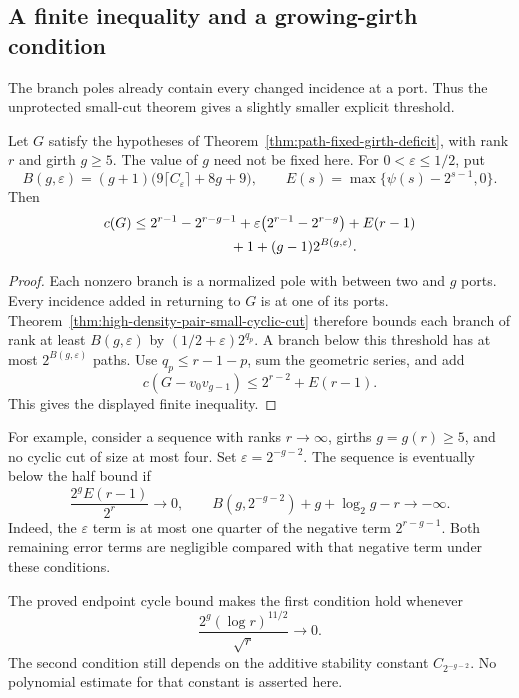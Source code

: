 \subsection{A finite inequality and a growing-girth condition}

The branch poles already contain every changed incidence at a port.
Thus the unprotected small-cut theorem gives a slightly smaller explicit threshold.

\begin{proposition}
\label{prop:path-fixed-girth-finite}
Let $G$ satisfy the hypotheses of Theorem~\ref{thm:path-fixed-girth-deficit}, with rank $r$ and girth $g\ge5$.
The value of $g$ need not be fixed here.
For $0<\varepsilon\le1/2$, put
\[
 B(g,\varepsilon)
  =(g+1)\bigl(9\lceil C_\varepsilon\rceil+8g+9\bigr),
 \qquad
 E(s)=\max\{\psi(s)-2^{s-1},0\}.
\]
Then
\begin{align*}
 c(G)\le{}&2^{r-1}-2^{r-g-1}
       +\varepsilon\bigl(2^{r-1}-2^{r-g}\bigr)
       +E(r-1)\\
       &\hspace{20mm}+1+(g-1)2^{B(g,\varepsilon)}.
\end{align*}
\end{proposition}

\begin{proof}
Each nonzero branch is a normalized pole with between two and $g$ ports.
Every incidence added in returning to $G$ is at one of its ports.
Theorem~\ref{thm:high-density-pair-small-cyclic-cut} therefore bounds each branch of rank at least $B(g,\varepsilon)$ by $(1/2+\varepsilon)2^{q_p}$.
A branch below this threshold has at most $2^{B(g,\varepsilon)}$ paths.
Use $q_p\le r-1-p$, sum the geometric series, and add
\[
 c(G-v_0v_{g-1})\le2^{r-2}+E(r-1).
\]
This gives the displayed finite inequality.
\end{proof}

For example, consider a sequence with ranks $r\to\infty$, girths $g=g(r)\ge5$, and no cyclic cut of size at most four.
Set $\varepsilon=2^{-g-2}$.
The sequence is eventually below the half bound if
\begin{equation}\label{eq:path-growing-girth-conditions}
 \frac{2^g E(r-1)}{2^r}\longrightarrow0,
 \qquad
 B(g,2^{-g-2})+g+\log_2 g-r\longrightarrow-\infty.
\end{equation}
Indeed, the $\varepsilon$ term is at most one quarter of the negative term $2^{r-g-1}$.
Both remaining error terms are negligible compared with that negative term under these conditions.

The proved endpoint cycle bound makes the first condition hold whenever
\[
 \frac{2^g(\log r)^{11/2}}{\sqrt r}\longrightarrow0.
\]
The second condition still depends on the additive stability constant $C_{2^{-g-2}}$.
No polynomial estimate for that constant is asserted here.
